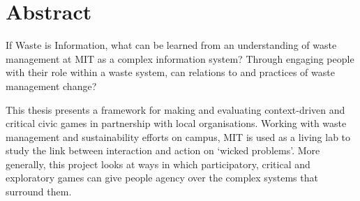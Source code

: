 \documentclass[nofonts,nols,justified,nobib]{tufte-book}
\begin{document}











\newpage

\chapter*{Abstract}

If Waste is Information, what can be learned from an understanding of waste management at MIT as a complex information system? Through engaging people with their role within a waste system, can relations to and practices of waste management change? 

This thesis presents a framework for making and evaluating context-driven and critical civic games in partnership with local organisations. Working with waste management and sustainability efforts on campus, MIT is used as a living lab to study the link between interaction and action on `wicked problems'. More generally, this project looks at ways in which participatory, critical and exploratory games can give people agency over the complex systems that surround them. 
\end{document}
